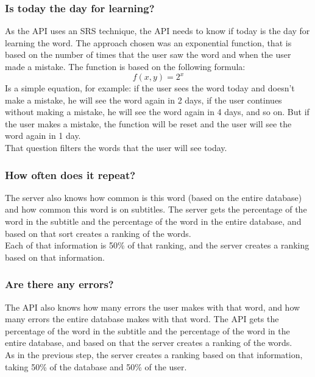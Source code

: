 \documentclass[12pt]{article}
\begin{document}
\subsubsection{Is today the day for learning?}
As the API uses an SRS technique, the API needs to know if today is the day for learning the word. The approach chosen was an exponential function, that is based on the number of times that the user saw the word and when the user made a mistake. The function is based on the following formula:
\begin{equation}
  \label{eq:1}
  f(x, y) = 2^x 
\end{equation}
Is a simple equation, for example: if the user sees the word today and doesn't make a mistake, he will see the word again in 2 days, if the user continues without making a mistake, he will see the word again in 4 days, and so on. But if the user makes a mistake, the function will be reset and the user will see the word again in 1 day. \\
That question filters the words that the user will see today. 
\subsubsection{How often does it repeat?}
The server also knows how common is this word (based on the entire database) and how common this word is on subtitles. The server gets the percentage of the word in the subtitle and the percentage of the word in the entire database, and based on that sort creates a ranking of the words. \\
Each of that information is 50\% of that ranking, and the server creates a ranking based on that information. 
\subsubsection{Are there any errors?}
The API also knows how many errors the user makes with that word, and how many errors the entire database makes with that word. The API gets the percentage of the word in the subtitle and the percentage of the word in the entire database, and based on that the server creates a ranking of the words. \\
As in the previous step, the server creates a ranking based on that information, taking 50\% of the database and 50\% of the user. \\
\end{document}

